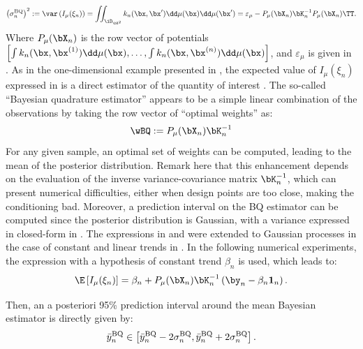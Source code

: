 \begin{equation}
    \left(\sigma_n^{\mathrm{BQ}}\right)^2 := \var\left(I_{\mu}(\xi_n) \right) 
    = \iint_{\iD_{\bX^2}} k_n(\bx, \bx') \dd \mu(\bx) \dd \mu(\bx') 
    = \varepsilon_\mu - P_\mu(\bX_n) \bK_n^{-1} P_\mu(\bX_n)\TT.
\label{eq:var_post}
\end{equation}
\noindent
Where $P_\mu(\bX_n)$ is the row vector of potentials $\left[\int k_n(\bx, \bx^{(1)}) \dd \mu(\bx), \dots, \int k_n(\bx, \bx^{(n)}) \dd \mu(\bx)\right]$, and $\varepsilon_\mu$ is given in . 
As in the one-dimensional example presented in , the expected value of $I_{\mu}(\xi_n)$ expressed in  is a direct estimator of the quantity of interest . 
The so-called ``Bayesian quadrature estimator'' appears to be a simple linear combination of the observations by taking the row vector of ``optimal weights'' as: 
\begin{equation}
    \wBQ := P_\mu(\bX_n) \bK_n^{-1}
    \label{eq:bq_weights}
\end{equation}
For any given sample, an optimal set of weights can be computed, leading to the mean of the posterior distribution. 
Remark here that this enhancement depends on the evaluation of the inverse variance-covariance matrix $\bK_n^{-1}$, which can present numerical difficulties, either when design points are too close, making the conditioning bad. 
Moreover, a prediction interval on the BQ estimator can be computed since the posterior distribution is Gaussian, with a variance expressed in closed-form in . 
The expressions in  and  were extended to Gaussian processes in the case of constant and linear trends in \cite{pronzato_zhigljavsky_2020}. 
In the following numerical experiments, the expression with a hypothesis of constant trend $\beta_n$ is used, which leads to:
\begin{equation}
     \E\left[I_{\mu}(\xi_n)\right] = \beta_n + P_\mu(\bX_n) \bK_n^{-1} \left(\by_n - \beta_n \mathbf{1}_n \right).
     \label{eq:mean_post_cst}
\end{equation}

\noindent Then, an a posteriori 95\% prediction interval around the mean Bayesian estimator is directly given by: 
\begin{equation}
   \Bar{y}_n^{\mathrm{BQ}} \in \left[\Bar{y}_n^{\mathrm{BQ}} - 2\sigma_n^{\mathrm{BQ}}, \Bar{y}_n^{\mathrm{BQ}} + 2\sigma_n^{\mathrm{BQ}} \right].
\end{equation}

